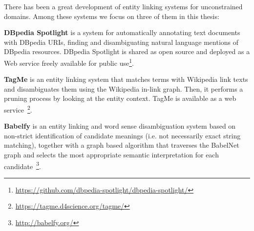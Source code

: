 There has been a great development of entity linking systems for unconstrained domains. Among these systems we focus on three of them in this thesis:

\noindent \textbf{DBpedia Spotlight} \citep{Mendes2011} is a system for automatically annotating text documents with DBpedia URIs, finding and disambiguating natural language mentions of DBpedia resources. DBpedia Spotlight is shared as open source and deployed as a Web service freely available for public use\footnote{\url{https://github.com/dbpedia-spotlight/dbpedia-spotlight/}}.

\noindent \textbf{TagMe} \citep{Ferragina2012} is an entity linking system that matches terms with Wikipedia link texts and disambiguates them using the Wikipedia in-link graph. Then, it performs a pruning process by looking at the entity context. TagMe is available as a web service~\footnote{\url{https://tagme.d4science.org/tagme/}}.

\noindent \textbf{Babelfy} \citep{Moroetal2014b} is an entity linking and word sense disambiguation system based on non-strict identification of candidate meanings (i.e. not necessarily exact string matching), together with a graph based algorithm that traverses the BabelNet graph and selects the most appropriate semantic interpretation for each candidate~\footnote{\url{http://babelfy.org/}}.

